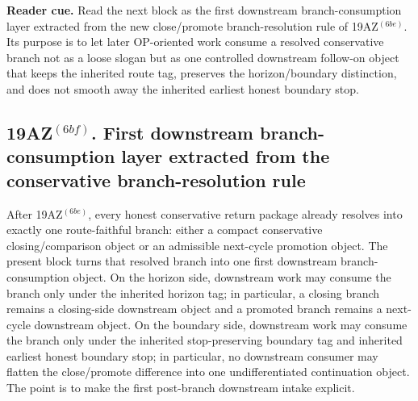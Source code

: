 \noindent\textbf{Reader cue.} Read the next block as the first downstream branch-consumption layer extracted from the new close/promote branch-resolution rule of 19AZ$^{(6be)}$. Its purpose is to let later OP-oriented work consume a resolved conservative branch not as a loose slogan but as one controlled downstream follow-on object that keeps the inherited route tag, preserves the horizon/boundary distinction, and does not smooth away the inherited earliest honest boundary stop.

\subsection*{19AZ$^{(6bf)}$. First downstream branch-consumption layer extracted from the conservative branch-resolution rule}
\label{sec:first-downstream-branch-consumption-layer-extracted-from-the-conservative-branch-resolution-rule}
After 19AZ$^{(6be)}$, every honest conservative return package already resolves into exactly one route-faithful branch: either a compact conservative closing/comparison object or an admissible next-cycle promotion object. The present block turns that resolved branch into one first downstream branch-consumption object. On the horizon side, downstream work may consume the branch only under the inherited horizon tag; in particular, a closing branch remains a closing-side downstream object and a promoted branch remains a next-cycle downstream object. On the boundary side, downstream work may consume the branch only under the inherited stop-preserving boundary tag and inherited earliest honest boundary stop; in particular, no downstream consumer may flatten the close/promote difference into one undifferentiated continuation object. The point is to make the first post-branch downstream intake explicit.

